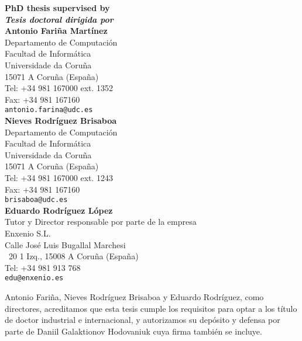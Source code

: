 \thispagestyle{empty}

\begin{flushleft}

{\bfseries PhD thesis supervised by} \\[1pt]
{\itshape \bfseries Tesis doctoral dirigida por} \\[4mm]

{\bfseries Antonio Fari\~na Mart\'inez} \\[2pt]
Departamento de Computaci\'on \\[1pt]
Facultad de Inform\'atica \\[1pt]
Universidade da Coru\~na \\[1pt]
15071 A Coru\~na (Espa\~na) \\[1pt]
Tel: +34 981 167000 ext. 1352 \\[1pt]
Fax: +34 981 167160 \\[1pt]
\verb=antonio.farina@udc.es= \\[4mm]

{\bfseries Nieves Rodr\'iguez Brisaboa} \\[2pt]
Departamento de Computaci\'on \\[1pt]
Facultad de Inform\'atica \\[1pt]
Universidade da Coru\~na \\[1pt]
15071 A Coru\~na (Espa\~na) \\[1pt]
Tel: +34 981 167000 ext. 1243 \\[1pt]
Fax: +34 981 167160 \\[1pt]
\verb=brisaboa@udc.es= \\[4mm]

{\bfseries Eduardo Rodr\'iguez L\'opez} \\[2pt]
Tutor y Director responsable por parte de la empresa \\[1pt]
Enxenio S.L. \\[1pt]
Calle Jos\'e Luis Bugallal Marchesi \\[1pt]
\textnumero~20 1 Izq., 15008 A Coru\~na (Espa\~na) \\[1pt]
Tel: +34 981 913 768 \\[1pt]
\verb=edu@enxenio.es=

\end{flushleft}

Antonio Fari\~na, Nieves Rodr\'iguez Brisaboa y Eduardo Rodr\'iguez, como directores, acreditamos que esta tesis cumple los requisitos para optar a los t\'itulo de doctor industrial e internacional, y autorizamos su dep\'osito y defensa por parte de Daniil Galaktionov Hodovaniuk cuya firma tambi\'en se incluye.



